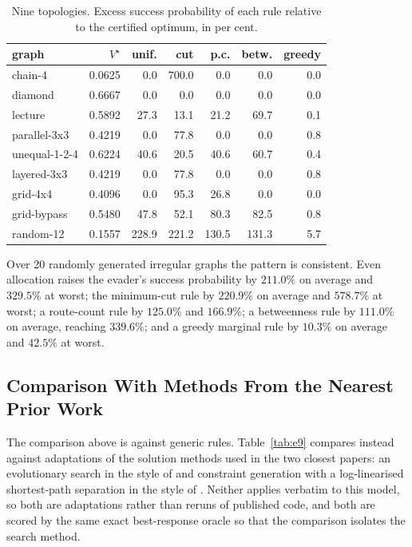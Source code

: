 \documentclass[10pt,a4paper,twoside]{article}
\theoremstyle{plain}
\theoremstyle{definition}
\begin{document}
\begin{table}[htbp]
\centering
\caption{Nine topologies. Excess success probability of each rule relative to
the certified optimum, in per cent.}
\label{tab:e3}
\small
\setlength{\tabcolsep}{4pt}
\begin{tabular}{lrrrrrr}
\toprule
graph & $V^{\star}$ & unif. & cut & p.c. & betw. & greedy\\
\midrule
chain-4       & 0.0625 & 0.0 & 700.0 & 0.0 & 0.0 & 0.0\\
diamond       & 0.6667 & 0.0 & 0.0 & 0.0 & 0.0 & 0.0\\
lecture       & 0.5892 & 27.3 & 13.1 & 21.2 & 69.7 & 0.1\\
parallel-3x3  & 0.4219 & 0.0 & 77.8 & 0.0 & 0.0 & 0.8\\
unequal-1-2-4 & 0.6224 & 40.6 & 20.5 & 40.6 & 60.7 & 0.4\\
layered-3x3   & 0.4219 & 0.0 & 77.8 & 0.0 & 0.0 & 0.8\\
grid-4x4      & 0.4096 & 0.0 & 95.3 & 26.8 & 0.0 & 0.0\\
grid-bypass   & 0.5480 & 47.8 & 52.1 & 80.3 & 82.5 & 0.8\\
random-12     & 0.1557 & 228.9 & 221.2 & 130.5 & 131.3 & 5.7\\
\bottomrule
\end{tabular}
\end{table}

Over 20 randomly generated irregular graphs the pattern is consistent. Even
allocation raises the evader's success probability by $211.0\%$ on average
and $329.5\%$ at worst; the minimum-cut rule by $220.9\%$ on average and
$578.7\%$ at worst; a route-count rule by $125.0\%$ and $166.9\%$; a
betweenness rule by $111.0\%$ on average, reaching $339.6\%$; and a greedy
marginal rule by $10.3\%$ on average and $42.5\%$ at worst.

\subsection{Comparison With Methods From the Nearest Prior Work}
\label{sec:results-h2h}

The comparison above is against generic rules. Table~\ref{tab:e9} compares
instead against adaptations of the solution methods used in the two closest
papers: an evolutionary search in the style of \citet{ramirez2011} and
constraint generation with a log-linearised shortest-path separation in the
style of \citet{nguyen2023}. Neither applies verbatim to this model, so both
are adaptations rather than reruns of published code, and both are scored by
the same exact best-response oracle so that the comparison isolates the
search method.
\end{document}
